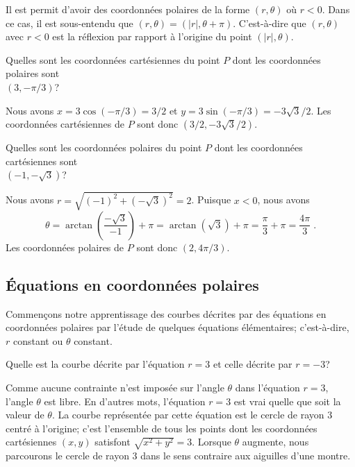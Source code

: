 {\begin{rmk}
Il est permit d'avoir des coordonnées polaires de la forme
$(r,\theta)$ où $r<0$.  Dans ce cas, il est sous-entendu que
$(r, \theta) = (|r|, \theta +\pi)$.  C'est-à-dire que $(r,\theta)$
avec $r<0$ est la réflexion par rapport à l'origine du point
$(|r|,\theta)$.
\end{rmk}

\begin{egg}
Quelles sont les coordonnées cartésiennes du point $P$ dont les
coordonnées polaires sont\\ $(3, -\pi/3)$?

Nous avons $x = 3 \cos(-\pi/3) = 3/2$ et $y = 3\sin(-\pi/3) = -3\sqrt{3}/2$.
Les coordonnées cartésiennes de $P$ sont donc $(3/2, -3\sqrt{3}/2)$.
\end{egg}

\begin{egg}
Quelles sont les coordonnées polaires du point $P$ dont les
coordonnées cartésiennes sont\\ $(-1, -\sqrt{3})$?

Nous avons $\displaystyle r = \sqrt{ (-1)^2 + (-\sqrt{3})^2} = 2$. Puisque
$x<0$, nous avons
\[
\theta = \arctan\left(\frac{-\sqrt{3}}{-1}\right) + \pi
= \arctan\left(\sqrt{3}\right) + \pi = \frac{\pi}{3} + \pi =
\frac{4\pi}{3} \; .
\]
Les coordonnées polaires de $P$ sont donc $(2, 4\pi/3)$.
\end{egg}

\subsection{Équations en coordonnées polaires}

Commençons notre apprentissage des courbes décrites par des équations
en coordonnées polaires par l'étude de quelques équations
élémentaires; c'est-à-dire, $r$ constant ou $\theta$ constant.

\begin{egg}
Quelle est la courbe décrite par l'équation $r=3$ et celle décrite par
$r=-3$?

Comme aucune contrainte n'est imposée sur l'angle $\theta$ dans
l'équation $r=3$, l'angle $\theta$ est libre.  En d'autres mots,
l'équation $r=3$ est vrai quelle que soit la valeur de $\theta$.  La
courbe représentée par cette équation est le cercle de rayon $3$
centré à l'origine; c'est l'ensemble de tous les points dont les
coordonnées cartésiennes $(x,y)$ satisfont $\sqrt{x^2+y^2} = 3$.
Lorsque $\theta$ augmente, nous parcourons le cercle de rayon $3$ dans
le sens contraire aux aiguilles d'une montre.


\end{egg}}
